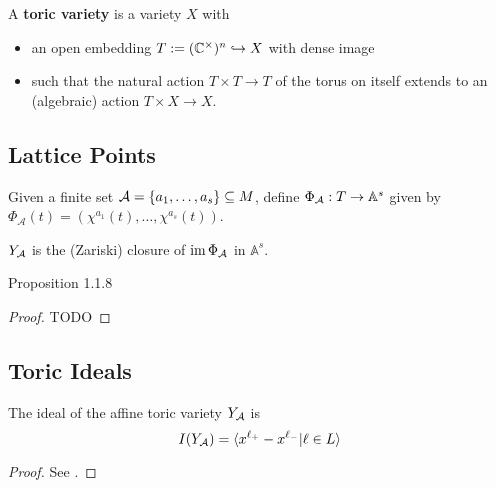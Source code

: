 \begin{definition}
  \label{1-1-3-aff-tor-var}
  \leanok

  A {\bf toric variety} is a variety $X$ with
  \begin{itemize}
    \item an open embedding $T := ({\mathbb C}^\times)^n \hookrightarrow X$ with dense image
    \item such that the natural action $T \times T \to T$ of the torus on itself extends to an (algebraic) action $T \times X \to X$.
  \end{itemize}
\end{definition}


\subsection{Lattice Points}


\begin{definition}
  \label{1-1-phiA}

  Given a finite set ${\mathcal A} = \{a_1, \dotsc, a_s\} \subseteq M$, define $\Phi_{{\mathcal A}} : T \to \mathbb{A}^s$ given by $\Phi_{\mathcal A} (t) = (\chi^{a_1} (t), \dotsc, \chi^{a_s} (t))$.
\end{definition}


\begin{definition}
  \label{1-1-7-ya}

  $Y_{{\mathcal A}}$ is the (Zariski) closure of $\operatorname{im} \Phi_{{\mathcal A}}$ in $\mathbb A^s$.
\end{definition}


\begin{proposition}
  \label{1-1-8-aff-tor-var-ya}

  Proposition 1.1.8
\end{proposition}
\begin{proof}

  TODO
\end{proof}


\subsection{Toric Ideals}


\begin{proposition}
  \label{1-1-9-ideal-ya}

  The ideal of the affine toric variety $Y_{{\mathcal A}}$ is
  \[
    I(Y_{{\mathcal A}}) = \langle x^{\ell_+} - x^{\ell_-} | \ell \in L\rangle
  \]
\end{proposition}
\begin{proof}
  \uses{}

  See \cite{Cox_2011}.
\end{proof}


